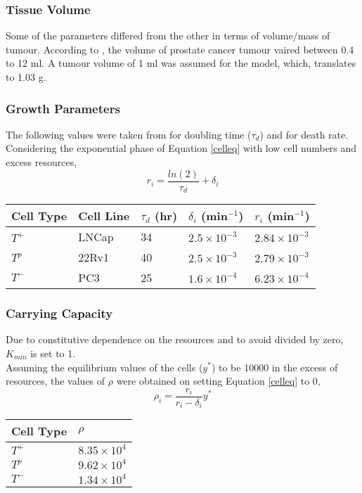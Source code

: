 \subsubsection{Tissue Volume}
Some of the parameters differed from the other in terms of volume/mass of tumour. According to \cite{Stamey}, the volume of prostate cancer tumour vaired between 0.4 to 12 ml. A tumour volume of 1 ml was assumed for the model, which, translates to 1.03 g.
\subsubsection{Growth Parameters}
The following values were taken from \cite{ATCC-lncap,ATCC-22rv1} for doubling time ($\tau_d$) and \cite{Jain} for death rate. Considering the exponential phase of Equation \ref{celleq} with low cell numbers and excess resources,
\begin{equation}
r_i = \frac{ln(2)}{\tau_d} + \delta_i
\end{equation}
\begin{table}[h]
\centering
\begin{tabular}{|l|l|l|l|l|}
  \hline
  Cell Type & Cell Line & $\tau_d$ (hr) & $\delta_i$ (min$^{-1}$) & $r_i$ (min$^{-1}$)    \\
  \hline
  $T^+$     & LNCap     & 34            & $2.5 \times 10^{-3}$    & $2.84 \times 10^{-3}$ \\
  $T^p$     & 22Rv1     & 40            & $2.5 \times 10^{-3}$    & $2.79 \times 10^{-3}$ \\
  $T^-$     & PC3       & 25            & $1.6 \times 10^{-4}$    & $6.23 \times 10^{-4}$ \\
  \hline
\end{tabular}
\end{table}
\subsubsection{Carrying Capacity}
Due to constitutive dependence on the resources and to avoid divided by zero, $K_{min}$ is set to 1. \\
Assuming the equilibrium values of the cells ($y^*$) to be 10000 in the excess of resources, the values of $\rho$ were obtained on setting Equation \ref{celleq} to 0,
\begin{equation}
\rho_i=\frac{r_i}{r_i-\delta_i} y^*
\end{equation}
\begin{table}[h]
\centering
\begin{tabular}{|l|l|}
  \hline
  Cell Type & $\rho$             \\
  \hline
  $T^+$     & $8.35 \times 10^4$ \\
  $T^p$     & $9.62 \times 10^4$ \\
  $T^-$     & $1.34 \times 10^4$ \\
  \hline
\end{tabular}
\end{table}
